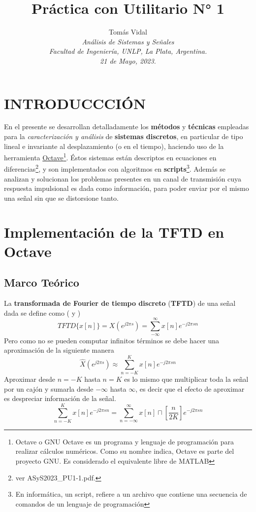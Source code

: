 \documentclass[letterpaper, 10 pt, conference]{ieeeconf}  %
\title{\LARGE \bf Pr\'actica con Utilitario N° 1}
\author{
  Tom\'as Vidal\\
  {\it An\'alisis de Sistemas y Se\~{n}ales}\\
  {\it Facultad de Ingenier\'ia, UNLP, La Plata, Argentina.}\\
  {\it 21 de Mayo, 2023.}
}
\begin{document}
\maketitle
\thispagestyle{empty}
\pagestyle{empty}

\section{INTRODUCCCI\'ON}
En el presente se desarrollan detalladamente los \textbf{m\'etodos} y \textbf{t\'ecnicas} empleadas para la \textit{caracterizaci\'on y an\'alisis} de \textbf{sistemas discretos}, en particular de tipo lineal e invariante al desplazamiento (o en el tiempo), haciendo uso de la herramienta \href{https://octave.org/}{Octave}\footnote{Octave o GNU Octave es un programa y lenguaje de programaci\'on para realizar c\'alculos num\'ericos. Como su nombre indica, Octave es parte del proyecto GNU. Es considerado el equivalente libre de MATLAB}. \'Estos sistemas est\'an descriptos en ecuaciones en diferencias\footnote{ver ASyS2023\_PU1-1.pdf.}, y son implementados con algoritmos en \textbf{scripts}\footnote{En inform\'atica, un script, refiere a un archivo que contiene una secuencia de comandos de un lenguaje de programaci\'on}. Adem\'as se analizan y solucionan los problemas presentes en un canal de transmisi\'on cuya respuesta impulsional es dada como informaci\'on, para poder enviar por el mismo una se\~nal sin que se distorsione tanto.

\section{Implementaci\'on de la \textbf{TFTD} en Octave}
\subsection{Marco Te\'orico} \label{subsec:TFTD}
La \textbf{transformada de Fourier de tiempo discreto} (\textbf{TFTD}) de una se\~{n}al dada se define como (\cite{bib:tftd_tp5} y \cite{bib:tftd_teoria})
\[
  TFTD\{x[n]\} = X(e^{j2{\pi}s}) = \sum_{-\infty}^{\infty}{x[n]e^{-j2{\pi}sn}}
\]
Pero como no se pueden computar infinitos t\'erminos se debe hacer una aproximaci\'on de la siguiente manera
\[
  \hat{X}(e^{j2{\pi}s}) \approx \sum_{n=-K}^{K}{x[n]e^{-j2{\pi}sn}}
\]
Aproximar desde $n=-K$ hasta $n=K$ es lo mismo que multiplicar toda la se\~nal por un caj\'on y sumarla desde $-\infty$ hasta $\infty$, es decir que el efecto de aproximar es despreciar informaci\'on de la se\~nal.
\[
  \sum_{n=-K}^{K}{x[n]e^{-j2{\pi}sn}} = \sum_{n=-\infty}^{\infty}{x[n]\sqcap[\frac{n}{2K}]e^{-j2{\pi}sn}}
\]
\end{document}
